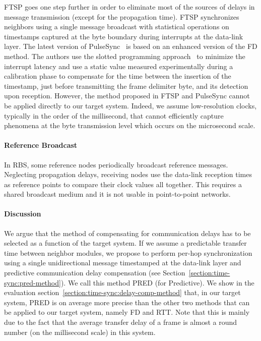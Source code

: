 FTSP goes one step further in order to eliminate most of the sources of delays in message transmission (except for the propagation time). FTSP synchronizes neighbors using a single message broadcast with statistical operations on timestamps captured at the byte boundary during interrupts at the data-link layer. The latest version of PulseSync~\cite{lenzen2015pulsesync} is based on an enhanced version of the FD method. The authors use the slotted programming approach~\cite{flury2010slotted} to minimize the interrupt latency and use a static value measured experimentally during a calibration phase to compensate for the time between the insertion of the timestamp, just before transmitting the frame delimiter byte, and its detection upon reception. However, the method proposed in FTSP and PulseSync cannot be applied directly to our target system. Indeed, we assume low-resolution clocks, typically in the order of the millisecond, that cannot efficiently capture phenomena at the byte transmission level which occurs on the microsecond scale.

\paragraph{Reference Broadcast}
In RBS, some reference nodes periodically broadcast reference messages. Neglecting propagation delays, receiving nodes use the data-link reception times as reference points to compare their clock values all together. This requires a shared broadcast medium and it is not usable in point-to-point networks.

\paragraph{Discussion}
We argue that the method of compensating for communication delays has to be selected as a function of the target system. If we assume a predictable transfer time between neighbor modules, we propose to perform per-hop synchronization using a single unidirectional message timestamped at the data-link layer and predictive communication delay compensation (see Section~\ref{section:time-sync:pred-method}). We call this method PRED (for Predictive). We show in the evaluation section~\ref{section:time-sync:delay-comp-method} that, in our target system, PRED is on average more precise than the other two methods that can be applied to our target system, namely FD and RTT. Note that this is mainly due to the fact that the average transfer delay of a frame is almost a round number (on the millisecond scale) in this system.

